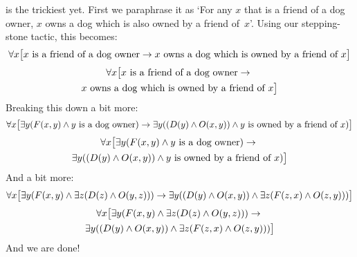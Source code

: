 is the trickiest yet. First we paraphrase it as
`For any $x$ that is a friend of a dog owner, $x$ owns a dog which is
also owned by a friend of~$x$'. Using our stepping-stone tactic, this
becomes:
\ifHTMLtarget
\[\forall x\bigl[x\text{ is a friend of a dog owner}\rightarrow 
x\text{ owns a dog which is owned by a friend of }x\bigr]\]
\else
\begin{multline*}
\forall x\bigl[x\text{ is a friend of a dog owner}\rightarrow {}\\
x\text{ owns a dog which is owned by a friend of }x\bigr]
\end{multline*}
\fi
Breaking this down a bit more:
\ifHTMLtarget
\[\forall x\bigl[\exists y(F(x,y) \wedge y\text{ is a dog owner})\rightarrow
\exists y((D(y) \wedge O(x,y)) \wedge y\text{ is owned by
a friend of }x)\bigr]\]
\else
\begin{multline*}
	\forall x\bigl[\exists y(F(x,y) \wedge y\text{ is a dog owner})\rightarrow {}\\
\exists y((D(y) \wedge O(x,y)) \wedge y\text{ is owned by a friend of }x)\bigr]
\end{multline*}
\fi
And a bit more: 
\ifHTMLtarget
\[\forall x\bigl[\exists y(F(x,y) \wedge \exists z(D(z) \wedge O(y,z))) \rightarrow 
\exists y((D(y) \wedge O(x,y)) \wedge \exists z(F(z,x) \wedge O(z,y)))\bigr]\]
\else
\begin{multline*}
\forall x\bigl[\exists y(F(x,y) \wedge \exists z(D(z) \wedge O(y,z))) \rightarrow {}\\
\exists y((D(y) \wedge O(x,y)) \wedge \exists z(F(z,x) \wedge O(z,y)))\bigr]
\end{multline*}
\fi
And we are done!

